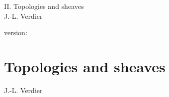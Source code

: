 \documentclass[10pt]{../fichiers-configuration-latex/smfart}
\begin{document}
\begin{center}
II. Topologies and sheaves\\
J.-L. Verdier
\end{center}

version: \showgitstatus
\tableofcontents

\else
\chapter{Topologies and sheaves}\label{sga4.exp.II}
\begin{center}
J.-L. Verdier
\end{center}
\fi






















\end{document}
